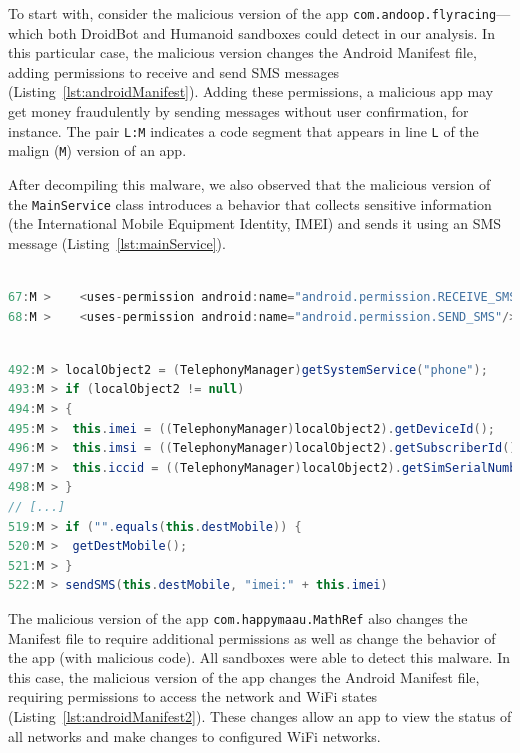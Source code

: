 To start with, consider the malicious version of the app \texttt{com.andoop.flyracing}---which both DroidBot and
Humanoid sandboxes could detect in our analysis. 
In this particular case, the malicious version changes the Android Manifest file,
adding permissions to receive and send SMS messages
(Listing~\ref{lst:androidManifest}). Adding these permissions, a malicious app may get money
fraudulently by sending messages without user confirmation, for instance.
The pair \texttt{L:M} indicates
a code segment that appears in line \texttt{L} of the malign (\texttt{M})
version of an app.

After decompiling this malware, we also observed that the malicious version of the
\texttt{MainService} class introduces a
behavior that collects sensitive information (the International Mobile
Equipment Identity, IMEI) and sends it using an SMS message
(Listing~\ref{lst:mainService}). 

\begin{lstlisting}[caption={Diffs in the \texttt{com.gau.screenguru.finger}
      AndroidManifest file of the malicious
      version}, language=Java,
    basicstyle=\fontsize{8}{6}\selectfont\ttfamily,
    label={lst:androidManifest}]

67:M >    <uses-permission android:name="android.permission.RECEIVE_SMS"/>
68:M >    <uses-permission android:name="android.permission.SEND_SMS"/>
\end{lstlisting}

\begin{lstlisting}[caption={Diffs in the malicious version
      of the class \texttt{com.android.main.MainService}
      (app \texttt{com.gau.screenguru.finger})},
      language=Java, basicstyle=\fontsize{8}{6}\selectfont\ttfamily,
      label={lst:mainService}]

492:M > localObject2 = (TelephonyManager)getSystemService("phone");
493:M > if (localObject2 != null)
494:M > {
495:M >  this.imei = ((TelephonyManager)localObject2).getDeviceId();
496:M >  this.imsi = ((TelephonyManager)localObject2).getSubscriberId();
497:M >  this.iccid = ((TelephonyManager)localObject2).getSimSerialNumber();
498:M > }
// [...]
519:M > if ("".equals(this.destMobile)) {
520:M >  getDestMobile();
521:M > }
522:M > sendSMS(this.destMobile, "imei:" + this.imei)
\end{lstlisting}

The malicious version of the app \texttt{com.happymaau.MathRef} also changes
the Manifest file to require additional permissions as well as change
the behavior of the app (with malicious code). All sandboxes were able to
detect this malware.
In this case, the malicious version of the app changes the Android Manifest file,
requiring permissions to access the network and WiFi states (Listing~\ref{lst:androidManifest2}).
These changes allow an app
to view the status of all networks and make changes to configured WiFi networks. 


